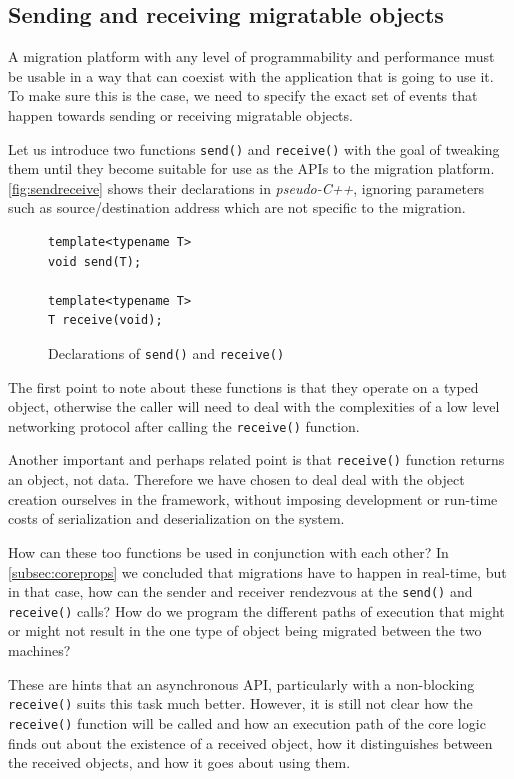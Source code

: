 \subsection{Sending and receiving migratable objects}
\label{subsec:sendrecmig}

A migration platform with any level of programmability and performance
must be usable in a way that can coexist with the application that is
going to use it. To make sure this is the case, we need to specify the
exact set of events that happen towards sending or receiving migratable
objects.

Let us introduce two functions \texttt{send()} and \texttt{receive()} with
the goal of tweaking them until they become suitable for use as the APIs
to the migration platform. \autoref{fig:sendreceive} shows their
declarations in \emph{pseudo-C++}, ignoring parameters such as
source/destination address which are not specific to the migration.

\begin{figure}[t]
\begin{lstlisting}
template<typename T>
void send(T);

template<typename T>
T receive(void);
\end{lstlisting}
\caption{
    Declarations of \texttt{send()} and \texttt{receive()}
}
\label{fig:sendreceive}
\end{figure}

The first point to note about these functions is that they operate on
a typed object, otherwise the caller will need to deal with the complexities
of a low level networking protocol after calling the \texttt{receive()}
function.

Another important and perhaps related point is that \texttt{receive()}
function returns an object, not data. Therefore we have chosen to deal
deal with the object creation ourselves in the framework, without imposing
development or run-time costs of serialization and deserialization on the
system.

How can these too functions be used in conjunction with each other?
In \autoref{subsec:coreprops} we concluded that migrations have to happen in
real-time, but in that case, how can the
sender and receiver rendezvous at the \texttt{send()} and
\texttt{receive()} calls? How do we program the different paths of
execution that might or might not result in the one type of object being
migrated between the two machines?

These are hints that an asynchronous API, particularly with a non-blocking
\texttt{receive()} suits this task much better. However, it is still not clear
how the \texttt{receive()} function will be called and how an execution path
of the core logic finds out about the existence of a received object,
how it distinguishes between the received objects, and how it goes about using
them.


